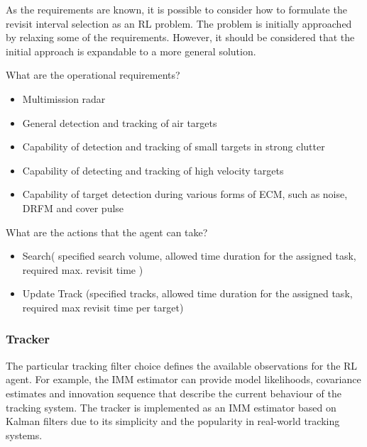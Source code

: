 \documentclass[english, 12pt, a4paper, elec, utf8, a-1b, online]{aaltothesis}
\begin{document}
As the requirements are known, it is possible to consider how to formulate the revisit interval selection as an RL problem. The problem is initially approached by relaxing some of the requirements. However, it should be considered that the initial approach is expandable to a more general solution. 


What are the operational requirements?

\begin{itemize}
    \item Multimission radar
    \item General detection and tracking of air targets
    \item Capability of detection and tracking of small targets in strong clutter
    \item Capability of detecting and tracking of high velocity targets
    \item Capability of target detection during various forms of ECM, such as noise, DRFM and cover pulse
\end{itemize}

What are the actions that the agent can take?

\begin{itemize}
    \item Search( specified search volume, allowed time duration for the assigned task, required max. revisit time )
    \item Update Track (specified tracks, allowed time duration for the assigned task, required max revisit time per target)
\end{itemize}



\subsubsection{Tracker}

The particular tracking filter choice defines the available observations for the RL agent.
For example, the IMM estimator can provide model likelihoods, covariance estimates and innovation sequence that describe the current behaviour of the tracking system.
The tracker is implemented as an IMM estimator based on Kalman filters due to its simplicity and the popularity in real-world tracking systems.
\end{document}
